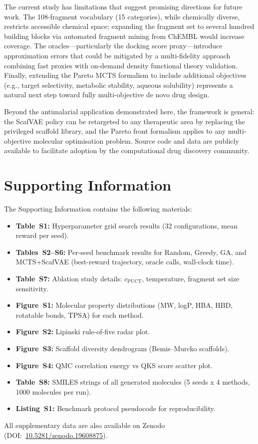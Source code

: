\documentclass[jcim,article,layout=manuscript]{achemso}
\begin{document}
The current study has limitations that suggest promising directions for
future work. The 108-fragment vocabulary (15 categories), while chemically diverse, restricts
accessible chemical space; expanding the fragment set to several hundred
building blocks via automated fragment mining from ChEMBL would increase
coverage. The oracles---particularly the docking score proxy---introduce
approximation errors that could be mitigated by a multi-fidelity approach
combining fast proxies with on-demand density functional theory validation.
Finally, extending the Pareto MCTS formalism to include additional
objectives (e.g., target selectivity, metabolic stability, aqueous
solubility) represents a natural next step toward fully multi-objective
de novo drug design.

Beyond the antimalarial application demonstrated here, the framework is
general: the ScafVAE policy can be retargeted to any therapeutic area by
replacing the privileged scaffold library, and the Pareto front formalism
applies to any multi-objective molecular optimisation problem. Source code
and data are publicly available to facilitate adoption by the
computational drug discovery community.

\section*{Supporting Information}
The Supporting Information contains the following materials:
\begin{itemize}[nosep]
  \item \textbf{Table~S1:} Hyperparameter grid search results
    (32 configurations, mean reward per seed).
  \item \textbf{Tables~S2--S6:} Per-seed benchmark results for Random,
    Greedy, GA, and MCTS+ScafVAE (best-reward trajectory, oracle calls,
    wall-clock time).
  \item \textbf{Table~S7:} Ablation study details: $c_{\text{PUCT}}$,
    temperature, fragment set size sensitivity.
  \item \textbf{Figure~S1:} Molecular property distributions (MW, logP,
    HBA, HBD, rotatable bonds, TPSA) for each method.
  \item \textbf{Figure~S2:} Lipinski rule-of-five radar plot.
  \item \textbf{Figure~S3:} Scaffold diversity dendrogram (Bemis--Murcko
    scaffolds).
  \item \textbf{Figure~S4:} QMC correlation energy vs QKS score
    scatter plot.
  \item \textbf{Table~S8:} SMILES strings of all generated molecules
    (5 seeds x 4 methods, 1000 molecules per run).
  \item \textbf{Listing~S1:} Benchmark protocol pseudocode for
    reproducibility.
\end{itemize}
All supplementary data are also available on Zenodo
(DOI:~\href{https://doi.org/10.5281/zenodo.19608875}{10.5281/zenodo.19608875}).
\end{document}

